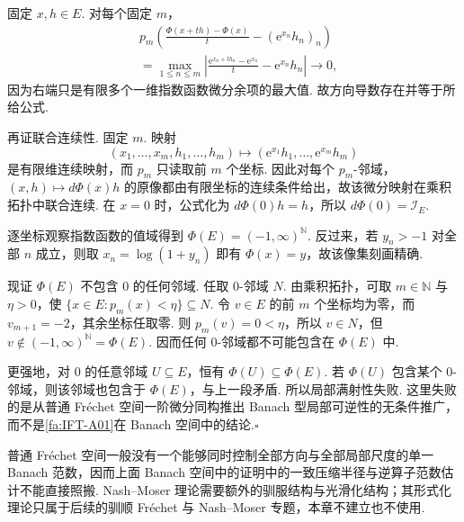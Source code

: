 \begin{FAProof}
固定 \(\displaystyle x,h\in E\). 对每个固定 \(\displaystyle m\)，
\[
\begin{aligned}
&p_m\left(
\frac{\Phi(x+th)-\Phi(x)}{t}
-
(\mathrm{e}^{x_n}h_n)_n
\right)\\[12pt]
&=
\max_{1\leqslant n\leqslant m}
\left|
\frac{\mathrm{e}^{x_n+th_n}-\mathrm{e}^{x_n}}{t}
-
\mathrm{e}^{x_n}h_n
\right|
\longrightarrow0,
\end{aligned}
\]
因为右端只是有限多个一维指数函数微分余项的最大值. 故方向导数存在并等于所给公式.

再证联合连续性. 固定 \(\displaystyle m\). 映射
\[
(x_1,\dots,x_m,h_1,\dots,h_m)
\longmapsto
(\mathrm{e}^{x_1}h_1,\dots,\mathrm{e}^{x_m}h_m)
\]
是有限维连续映射，而 \(\displaystyle p_m\) 只读取前 \(\displaystyle m\) 个坐标. 因此对每个 \(\displaystyle p_m\)-邻域，\(\displaystyle(x,h)\mapsto d\Phi(x)h\) 的原像都由有限坐标的连续条件给出，故该微分映射在乘积拓扑中联合连续. 在 \(\displaystyle x=0\) 时，公式化为 \(\displaystyle d\Phi(0)h=h\)，所以 \(\displaystyle d\Phi(0)=\mathcal I_E\).

逐坐标观察指数函数的值域得到
\(\displaystyle \Phi(E) = (-1,\infty)^{\mathbb N}.\)
反过来，若 \(\displaystyle y_n>-1\) 对全部 \(\displaystyle n\) 成立，则取 \(\displaystyle x_n=\log(1+y_n)\) 即有 \(\displaystyle\Phi(x)=y\)，故该像集刻画精确.

现证 \(\displaystyle\Phi(E)\) 不包含 \(\displaystyle0\) 的任何邻域. 任取 \(\displaystyle0\)-邻域 \(\displaystyle N\). 由乘积拓扑，可取 \(\displaystyle m\in\mathbb N\) 与 \(\displaystyle\eta>0\)，使
\(\displaystyle \{x\in E:p_m(x)<\eta\} \subseteq N.\)
令 \(\displaystyle v\in E\) 的前 \(\displaystyle m\) 个坐标均为零，而 \(\displaystyle v_{m+1}=-2\)，其余坐标任取零. 则 \(\displaystyle p_m(v)=0<\eta\)，所以 \(\displaystyle v\in N\)，但 \(\displaystyle v\notin(-1,\infty)^{\mathbb N}=\Phi(E)\). 因而任何 \(\displaystyle0\)-邻域都不可能包含在 \(\displaystyle\Phi(E)\) 中.

更强地，对 \(\displaystyle0\) 的任意邻域 \(\displaystyle U\subseteq E\)，恒有 \(\displaystyle\Phi(U)\subseteq\Phi(E)\). 若 \(\displaystyle\Phi(U)\) 包含某个 \(\displaystyle0\)-邻域，则该邻域也包含于 \(\displaystyle\Phi(E)\)，与上一段矛盾. 所以局部满射性失败. 这里失败的是从普通 Fréchet 空间一阶微分同构推出 Banach 型局部可逆性的无条件推广，而不是\autoref{fa:IFT-A01}在 Banach 空间中的结论.\hfill\(\square\)

\end{FAProof}

普通 Fréchet 空间一般没有一个能够同时控制全部方向与全部局部尺度的单一 Banach 范数，因而上面 Banach 空间中的证明中的一致压缩半径与逆算子范数估计不能直接照搬. Nash--Moser 理论需要额外的驯服结构与光滑化结构；其形式化理论只属于后续的驯顺 Fréchet 与 Nash--Moser 专题，本章不建立也不使用.

